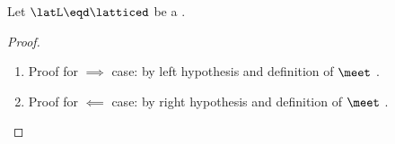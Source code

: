 \begin{lemma}
\label{lem:le_meet}
Let $\latL\eqd\latticed$ be a  .
\end{lemma}
\begin{proof}
\begin{enumerate}
  \item Proof for $\implies$ case: by left hypothesis and definition of $\meet$ .
  \item Proof for $\impliedby$ case: by right hypothesis and definition of $\meet$ .
\end{enumerate}
\end{proof}


